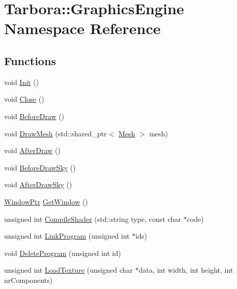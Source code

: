 \hypertarget{namespaceTarbora_1_1GraphicsEngine}{}\section{Tarbora\+:\+:Graphics\+Engine Namespace Reference}
\label{namespaceTarbora_1_1GraphicsEngine}
\subsection*{Functions}
\begin{DoxyCompactItemize}
\item 
void \hyperlink{namespaceTarbora_1_1GraphicsEngine_a9badc9df53b131e9629b433765b18d86}{Init} ()
\item 
void \hyperlink{namespaceTarbora_1_1GraphicsEngine_a2429f1284717c7c7e80ea2b7adb6dfd1}{Close} ()
\item 
void \hyperlink{namespaceTarbora_1_1GraphicsEngine_a7d09b2a2f6d44913d6a3b9622e5fdc55}{Before\+Draw} ()
\item 
void \hyperlink{namespaceTarbora_1_1GraphicsEngine_aa63a14a3dea4c47f2b9d4e8d15086d96}{Draw\+Mesh} (std\+::shared\+\_\+ptr$<$ \hyperlink{classTarbora_1_1Mesh}{Mesh} $>$ mesh)
\item 
void \hyperlink{namespaceTarbora_1_1GraphicsEngine_a3e3774928c037ea12d427d4fc2c77582}{After\+Draw} ()
\item 
void \hyperlink{namespaceTarbora_1_1GraphicsEngine_ace56d35cedd39989e8ba748654698f8a}{Before\+Draw\+Sky} ()
\item 
void \hyperlink{namespaceTarbora_1_1GraphicsEngine_a4a2e963c758cea1f12415c57e1bd2f7a}{After\+Draw\+Sky} ()
\item 
\hyperlink{namespaceTarbora_a39d9bc5a791c73dc51bee4255997ac12}{Window\+Ptr} \hyperlink{namespaceTarbora_1_1GraphicsEngine_a35bd82a619d7fdff0fc626955545f352}{Get\+Window} ()
\item 
unsigned int \hyperlink{namespaceTarbora_1_1GraphicsEngine_a5b52e66f40e2afaaf168e0a585a1f4b8}{Compile\+Shader} (std\+::string type, const char $\ast$code)
\item 
unsigned int \hyperlink{namespaceTarbora_1_1GraphicsEngine_a1f9fb33b0760c37663a9056694b63ddf}{Link\+Program} (unsigned int $\ast$ids)
\item 
void \hyperlink{namespaceTarbora_1_1GraphicsEngine_ab306520bce25cd5f1beb827fcb11dafc}{Delete\+Program} (unsigned int id)
\item 
unsigned int \hyperlink{namespaceTarbora_1_1GraphicsEngine_a87f26fb14a8bdf13628ec744244b8a22}{Load\+Texture} (unsigned char $\ast$data, int width, int height, int nr\+Components)

\end{DoxyCompactItemize}

